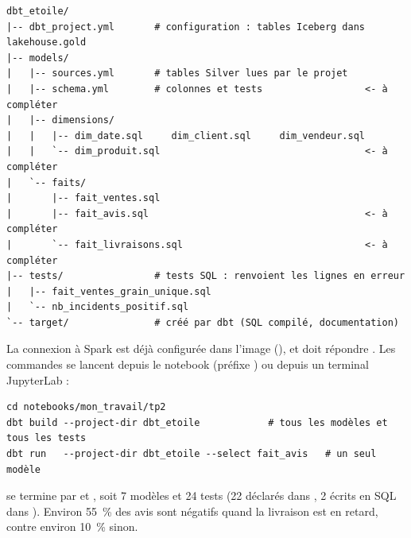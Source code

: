 \begin{lstlisting}[style=shell]
dbt_etoile/
|-- dbt_project.yml       # configuration : tables Iceberg dans lakehouse.gold
|-- models/
|   |-- sources.yml       # tables Silver lues par le projet
|   |-- schema.yml        # colonnes et tests                  <- à compléter
|   |-- dimensions/
|   |   |-- dim_date.sql     dim_client.sql     dim_vendeur.sql
|   |   `-- dim_produit.sql                                    <- à compléter
|   `-- faits/
|       |-- fait_ventes.sql
|       |-- fait_avis.sql                                      <- à compléter
|       `-- fait_livraisons.sql                                <- à compléter
|-- tests/                # tests SQL : renvoient les lignes en erreur
|   |-- fait_ventes_grain_unique.sql
|   `-- nb_incidents_positif.sql
`-- target/               # créé par dbt (SQL compilé, documentation)
\end{lstlisting}

La connexion à Spark est déjà configurée dans l'image (), et  doit répondre . Les commandes se lancent depuis le notebook
(préfixe \cmd{!}) ou depuis un terminal JupyterLab :

\begin{lstlisting}[style=shell]
cd notebooks/mon_travail/tp2
dbt build --project-dir dbt_etoile            # tous les modèles et tous les tests
dbt run   --project-dir dbt_etoile --select fait_avis   # un seul modèle
\end{lstlisting}

\begin{resultat}
 se termine par  et , soit 7 modèles et 24 tests
(22 déclarés dans , 2 écrits en SQL dans ). Environ 55~\% des avis sont
négatifs quand la livraison est en retard, contre environ 10~\% sinon.
\end{resultat}

